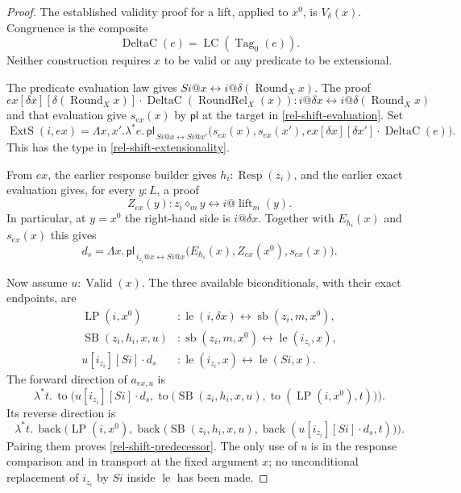 \begin{proof}
The established validity proof for a lift, applied to $x^0$, is
$V_\delta(x)$.  Congruence is the composite
\[
 \operatorname{DeltaC}(e)
       =\operatorname{LC}(\operatorname{Tag}_0(e)).
\]
Neither construction requires $x$ to be valid or any predicate to
be extensional.

The predicate evaluation law gives
$Si@x\leftrightarrow i@\delta(\operatorname{Round}_Xx)$.
The proof
\[
 ex[\delta x][\delta(\operatorname{Round}_Xx)]\cdot
      \operatorname{DeltaC}(\operatorname{RoundRel}_X(x))
 :i@\delta x\leftrightarrow
      i@\delta(\operatorname{Round}_Xx)
\]
and that evaluation give $s_{ex}(x)$ by $\mathsf{pl}$ at the target
in \eqref{rel-shift-evaluation}.  Set
\[
 \operatorname{ExtS}(i,ex)=
 \Lambda x,x'.\lambda^*e.\,
 \mathsf{pl}_{\,Si@x\leftrightarrow Si@x'}
 \bigl(s_{ex}(x),s_{ex}(x'),
       ex[\delta x][\delta x']\cdot\operatorname{DeltaC}(e)\bigr).
\]
This has the type in \eqref{rel-shift-extensionality}.

From $ex$, the earlier response builder gives
$h_i:\operatorname{Resp}(z_i)$, and the earlier exact evaluation
gives, for every $y:L$, a proof
\[
 Z_{ex}(y):z_i\diamond_m y\leftrightarrow
                i@\operatorname{lift}_m(y).
\]
In particular, at $y=x^0$ the right-hand side is $i@\delta x$.
Together with $E_{h_i}(x)$ and $s_{ex}(x)$ this gives
\[
 d_s=\Lambda x.\,
 \mathsf{pl}_{\,i_{z_i}@x\leftrightarrow Si@x}
 \bigl(E_{h_i}(x),Z_{ex}(x^0),s_{ex}(x)\bigr).
\]

Now assume $u:\operatorname{Valid}(x)$.  The three available
biconditionals, with their exact endpoints, are
\begin{align*}
 \operatorname{LP}(i,x^0)&:
 \operatorname{le}(i,\delta x)
       \leftrightarrow\operatorname{sb}(z_i,m,x^0),\\
 \operatorname{SB}(z_i,h_i,x,u)&:
 \operatorname{sb}(z_i,m,x^0)
       \leftrightarrow\operatorname{le}(i_{z_i},x),\\
 u[i_{z_i}][Si]\cdot d_s&:
 \operatorname{le}(i_{z_i},x)
       \leftrightarrow\operatorname{le}(Si,x).
\end{align*}
The forward direction of $a_{ex,u}$ is
\[
 \lambda^*t.\,
 \operatorname{to}\bigl(u[i_{z_i}][Si]\cdot d_s,
  \operatorname{to}\bigl(\operatorname{SB}(z_i,h_i,x,u),
   \operatorname{to}(\operatorname{LP}(i,x^0),t)\bigr)\bigr).
\]
Its reverse direction is
\[
 \lambda^*t.\,
 \operatorname{back}\bigl(\operatorname{LP}(i,x^0),
  \operatorname{back}\bigl(\operatorname{SB}(z_i,h_i,x,u),
   \operatorname{back}(u[i_{z_i}][Si]\cdot d_s,t)\bigr)\bigr).
\]
Pairing them proves \eqref{rel-shift-predecessor}.  The only use of
$u$ is in the response comparison and in transport at the fixed
argument $x$; no unconditional replacement of $i_{z_i}$ by $Si$
inside $\operatorname{le}$ has been made.
\end{proof}

